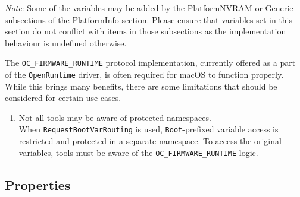 \documentclass[]{article}
\makeatletter
\renewcommand{\label}[1]{%
\zref@wrapper@immediate{\oldlabel{#1}}}  %
\makeatother
\begin{document}
\emph{Note}: Some of the variables may be added by the
\hyperref[platforminfonvram]{PlatformNVRAM} or
\hyperref[platforminfogeneric]{Generic} subsections of the
\hyperref[platforminfo]{PlatformInfo} section.
Please ensure that variables set in this section do not conflict with items
in those subsections as the implementation behaviour is undefined otherwise.

The \texttt{OC\_FIRMWARE\_RUNTIME} protocol implementation, currently offered
as a part of the \texttt{OpenRuntime} driver, is often required for macOS to
function properly. While this brings many benefits, there are some
limitations that should be considered for certain use cases.

\begin{enumerate}
\item Not all tools may be aware of protected namespaces.\\
  When \texttt{RequestBootVarRouting} is used, \texttt{Boot}-prefixed variable access
  is restricted and protected in a separate namespace. To access the original variables,
  tools must be aware of the \texttt{OC\_FIRMWARE\_RUNTIME} logic.
\end{enumerate}

\subsection{Properties}\label{nvramprops}
\end{document}
